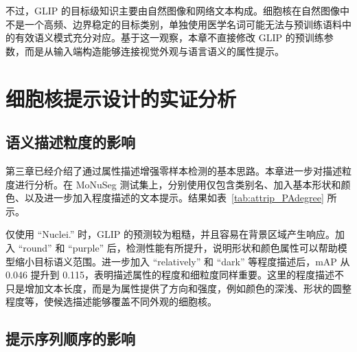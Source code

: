 不过，GLIP 的目标级知识主要由自然图像和网络文本构成。细胞核在自然图像中不是一个高频、边界稳定的目标类别，单独使用医学名词可能无法与预训练语料中的有效语义模式充分对应。基于这一观察，本章不直接修改 GLIP 的预训练参数，而是从输入端构造能够连接视觉外观与语言语义的属性提示。

\section{细胞核提示设计的实证分析}

\subsection{语义描述粒度的影响}

第三章已经介绍了通过属性描述增强零样本检测的基本思路。本章进一步对描述粒度进行分析。在 MoNuSeg 测试集上，分别使用仅包含类别名、加入基本形状和颜色、以及进一步加入程度描述的文本提示。结果如表~\ref{tab:attrip_PAdegree} 所示。

\begin{table}[t]
\caption{MoNuSeg 测试集上不同文本提示的 mAP。提示从上到下逐步增加语义描述的细节。}
\label{tab:attrip_PAdegree}
\begin{center}
\begin{small}
\end{small}
\end{center}
\vskip -0.1in
\end{table}

仅使用 ``Nuclei.'' 时，GLIP 的预测较为粗糙，并且容易在背景区域产生响应。加入 ``round'' 和 ``purple'' 后，检测性能有所提升，说明形状和颜色属性可以帮助模型缩小目标语义范围。进一步加入 ``relatively'' 和 ``dark'' 等程度描述后，mAP 从 0.046 提升到 0.115，表明描述属性的程度和细粒度同样重要。这里的程度描述不只是增加文本长度，而是为属性提供了方向和强度，例如颜色的深浅、形状的圆整程度等，使候选描述能够覆盖不同外观的细胞核。

\subsection{提示序列顺序的影响}

